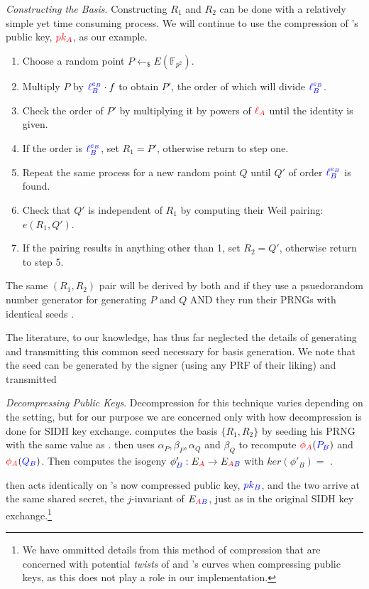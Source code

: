 \noindent
\textit{Constructing the Basis}. Constructing $R_1$ and $R_2$ can be done with a relatively simple yet time consuming process. We will continue to use the compression of \alice's public key, $\textcolor{red}{pk_A}$, as our example.
\begin{enumerate}
\item Choose a random point $P \leftarrow_{\$} E(\mathbb{F}_{p^2})$.
\item Multiply $P$ by $\textcolor{blue}{\ell_{B}^{e_B}} \cdot f$ to obtain $P'$, the order of which will divide $\textcolor{blue}{\ell_{B}^{e_B}}$.
\item Check the order of $P'$ by multiplying it by powers of $\textcolor{red}{\ell_{A}}$ until the identity is given.
\item If the order is $\textcolor{blue}{\ell_{B}^{e_B}}$, set $R_1 = P'$, otherwise return to step one.
\item Repeat the same process for a new random point $Q$ until $Q'$ of order $\textcolor{blue}{\ell_{B}^{e_B}}$ is found.
\item Check that $Q'$ is independent of $R_1$ by computing their Weil pairing: $e(R_1, Q')$.
\item If the pairing results in anything other than 1, set $R_2 = Q'$, otherwise return to step 5.
\end{enumerate}

The same $(R_1, R_2)$ pair will be derived by both \alice and \bob if they use a psuedorandom number generator for generating $P$ and $Q$ AND they run their PRNGs with identical seeds \cite{pwcomp}.

The literature, to our knowledge, has thus far neglected the details of generating and transmitting this common seed necessary for basis generation. We note that the seed can be generated by the signer (using any PRF of their liking) and transmitted 

\noindent
\textit{Decompressing Public Keys}. Decompression for this technique varies depending on the setting, but for our purpose we are concerned only with how decompression is done for SIDH key exchange. \bob computes the basis $\{R_1, R_2\}$ by seeding his PRNG with the same value as \alice. \bob then uses $\alpha_P, \beta_P, \alpha_Q$ and $\beta_Q$ to recompute $\textcolor{red}{\phi_A}(\textcolor{blue}{P_B})$ and $\textcolor{red}{\phi_A}(\textcolor{blue}{Q_B})$. Then \bob computes the isogeny $\phi'_{\textcolor{blue}{B}} : E_{\textcolor{red}{A}} \rightarrow E_{\textcolor{red}{A}\textcolor{blue}{B}}$ with $ker(\phi'_{B}) =$ \cite{compwr}. 

\alice then acts identically on \bob's now compressed public key, $\textcolor{blue}{pk_B}$, and the two arrive at the same shared secret, the $j$-invariant of $E_{\textcolor{red}{A}\textcolor{blue}{B}}$, just as in the original SIDH key exchange.\footnote{We have ommitted details from this method of compression that are concerned with potential \textit{twists} of \alice and \bob's curves when compressing public keys, as this does not play a role in our implementation. }

